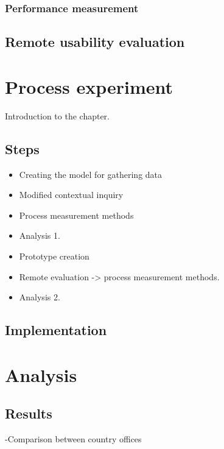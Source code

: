 \documentclass[12pt,a4paper,oneside,pdftex]{report}
\begin{document}
        \subsection{Performance measurement}

 
    
    \section{Remote usability evaluation}
    \label{sec:rue}
    
\chapter{Process experiment}
\label{processexperiment}
Introduction to the chapter.

    \section{Steps}
    \label{sec:steps}
        \begin{itemize}
            \item Creating the model for gathering data
            \item Modified contextual inquiry 
            \item Process measurement methods
            \item Analysis 1.
            \item Prototype creation
            \item Remote evaluation -> process measurement methods.
            \item Analysis 2.
        \end{itemize}

    \section{Implementation}
    \label{sec:implementation}
    
\chapter{Analysis}
\label{chapter:analysis}

    \section{Results}
    \label{sec:results}
    -Comparison between country offices
\end{document}
